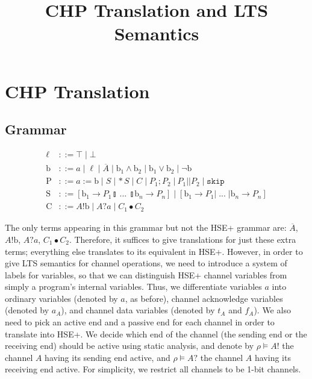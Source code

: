 \documentclass{article}
\begin{document}
\title{CHP Translation and LTS Semantics}
\author{}
\maketitle

\section{CHP Translation}

\subsection{Grammar}
\begin{align*}
    \ell & ::= \top \; | \perp \\
    \mathrm{b} & ::= a \; | \; \ell \; | \; \overline{A} \; | \; \mathrm{b}_1 \wedge \mathrm{b}_2 \; | \; \mathrm{b}_1 \vee \mathrm{b}_2 \; | \; \lnot \mathrm{b} \\
    \mathrm{P} & ::= a := \mathrm{b} \; | \; S \; | \, *S \; | \; C \; | \; P_1; P_2 \; | \: P_1 || P_2 \; | \; \mathtt{skip} \\
    \mathrm{S} & ::= [ \mathrm{b}_1 \rightarrow P_1 \talloblong \; ... \; \talloblong \mathrm{b}_n \rightarrow P_n ] \; | \; [ \mathrm{b}_1 \rightarrow P_1 | \; ... \; | \mathrm{b}_n \rightarrow P_n ] \\
    \mathrm{C} & ::= A!\mathrm{b} \; | \; A?a \; | \; C_1 \bullet C_2
\end{align*}

The only terms appearing in this grammar but not the HSE+ grammar are: $\overline{A}$, $A!\mathrm{b}$, $A?a$, $C_1 \bullet C_2$.
Therefore, it suffices to give translations for just these extra terms; everything else translates to its equivalent in HSE+.
However, in order to give LTS semantics for channel operations, we need to introduce a system of labels for variables, so that we can distinguish HSE+ channel variables from simply a program's internal variables.
Thus, we differentiate variables $a$ into ordinary variables (denoted by $a$, as before), channel acknowledge variables (denoted by $a_A$), and channel data variables (denoted by $t_A$ and $f_A$).
We also need to pick an active end and a passive end for each channel in order to translate into HSE+.
We decide which end of the channel (the sending end or the receiving end) should be active using static analysis, and denote by $\rho \vDash A!$ the channel $A$ having its sending end active, and $\rho \vDash A?$ the channel $A$ having its receiving end active.
For simplicity, we restrict all channels to be 1-bit channels.
\end{document}
